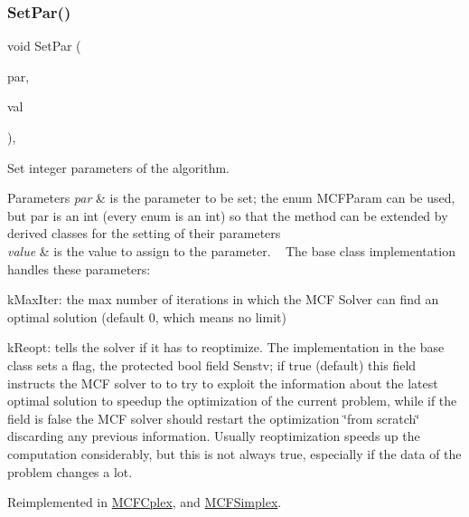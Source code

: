 \subsubsection{\texorpdfstring{Set\+Par()}{SetPar()}\hspace{0.1cm}{\footnotesize\ttfamily [1/2]}}
{\footnotesize\ttfamily void Set\+Par (\begin{DoxyParamCaption}\item[{int}]{par,  }\item[{int}]{val }\end{DoxyParamCaption})\hspace{0.3cm}{\ttfamily [inline]}, {\ttfamily [virtual]}}

Set integer parameters of the algorithm.


\begin{DoxyParams}{Parameters}
{\em par} & is the parameter to be set; the enum M\+C\+F\+Param can be used, but \textquotesingle{}par\textquotesingle{} is an int (every enum is an int) so that the method can be extended by derived classes for the setting of their parameters\\
\hline
{\em value} & is the value to assign to the parameter. ~\newline
 The base class implementation handles these parameters\+:\\
\hline
\end{DoxyParams}

\begin{DoxyItemize}
\item k\+Max\+Iter\+: the max number of iterations in which the M\+CF Solver can find an optimal solution (default 0, which means no limit)
\item k\+Reopt\+: tells the solver if it has to reoptimize. The implementation in the base class sets a flag, the protected {\ttfamily bool} field {\ttfamily Senstv}; if true (default) this field instructs the M\+CF solver to to try to exploit the information about the latest optimal solution to speedup the optimization of the current problem, while if the field is false the M\+CF solver should restart the optimization \char`\"{}from scratch\char`\"{} discarding any previous information. Usually reoptimization speeds up the computation considerably, but this is not always true, especially if the data of the problem changes a lot. 
\end{DoxyItemize}

Reimplemented in \mbox{\hyperlink{class_m_c_f_cplex_a12105bbd99b8b7ad7efae3bb0c222b3c}{M\+C\+F\+Cplex}}, and \mbox{\hyperlink{class_m_c_f_simplex_aebda2a23b313bb3ab143e66137ada924}{M\+C\+F\+Simplex}}.

